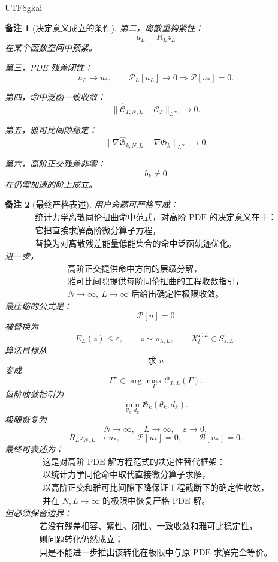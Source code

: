 \documentclass[12pt]{article}
\newtheorem{remark}{备注}[section]
\begin{document}
\begin{CJK*}{UTF8}{gkai}
\begin{remark}[决定意义成立的条件]
第二，离散重构紧性：
\[
  u_L=R_Lz_L
\]
在某个函数空间中预紧。

第三，PDE 残差闭性：
\[
  u_L\to u_*,
  \qquad
  \mathcal P_L[u_L]\to0
  \Longrightarrow
  \mathcal P[u_*]=0.
\]

第四，命中泛函一致收敛：
\[
  \lVert
  \widehat{\mathcal C}_{T,N,L}-\mathcal C_T
  \rVert_{L^\infty}\to0.
\]

第五，雅可比间隙稳定：
\[
  \lVert
  \nabla\widehat{\mathfrak G}_{k,N,L}
  -
  \nabla\mathfrak G_k
  \rVert_{L^\infty}\to0.
\]

第六，高阶正交残差非零：
\[
  b_k\neq0
\]
在仍需加速的阶上成立。
\end{remark}

\begin{remark}[最终严格表述]
用户命题可严格写成：
\[
  \boxed{
  \begin{gathered}
  \text{统计力学离散同伦扭曲命中范式，对高阶 PDE 的决定意义在于：}\\
  \text{它把直接求解高阶微分算子方程，}\\
  \text{替换为对离散残差能量低能集合的命中泛函轨迹优化。}
  \end{gathered}
  }
\]
进一步，
\[
  \boxed{
  \begin{gathered}
  \text{高阶正交提供命中方向的层级分解，}\\
  \text{雅可比间隙提供每阶同伦扭曲的工程收敛指引，}\\
  N\to\infty,\ L\to\infty
  \text{ 后给出确定性极限收敛。}
  \end{gathered}
  }
\]
最压缩的公式是：
\[
  \mathcal P[u]=0
\]
被替换为
\[
  E_L(z)\le\varepsilon,
  \qquad
  z\sim\pi_{\lambda,L},
  \qquad
  X_t^{\Gamma,L}\in S_{\varepsilon,L}.
\]
算法目标从
\[
  \text{求 }u
\]
变成
\[
  \Gamma^\star
  \in
  \arg\max_\Gamma
  \mathcal C_{T,L}(\Gamma).
\]
每阶收敛指引为
\[
  \min_{\theta_k,d_k}
  \mathfrak G_k(\theta_k,d_k).
\]
极限恢复为
\[
  N\to\infty,\quad L\to\infty,\quad \varepsilon\to0,
\]
\[
  R_Lz_{N,L}\to u_*,
  \qquad
  \mathcal P[u_*]=0,
  \qquad
  \mathcal B[u_*]=0.
\]
最终可表述为：
\[
  \boxed{
  \begin{gathered}
  \text{这是对高阶 PDE 解方程范式的决定性替代框架：}\\
  \text{以统计力学同伦命中取代直接微分算子求解，}\\
  \text{以高阶正交和雅可比间隙下降保证工程截断下的确定性收敛，}\\
  \text{并在 }N,L\to\infty\text{ 的极限中恢复严格 PDE 解。}
  \end{gathered}
  }
\]
但必须保留边界：
\[
  \boxed{
  \begin{gathered}
  \text{若没有残差相容、紧性、闭性、一致收敛和雅可比稳定性，}\\
  \text{则问题转化仍然成立；}\\
  \text{只是不能进一步推出该转化在极限中与原 PDE 求解完全等价。}
  \end{gathered}
  }
\]
\end{remark}


\end{CJK*}
\end{document}
